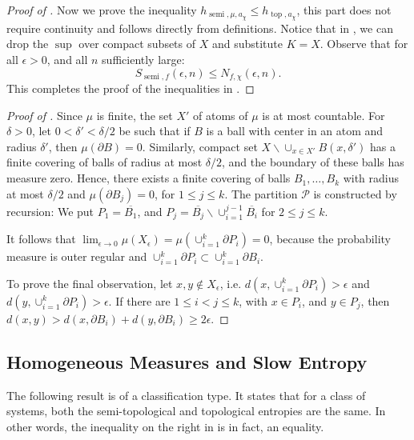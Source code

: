 \documentclass[oneside]{amsart}
\theoremstyle{plain}
\theoremstyle{definition}
\newcommand{\<}{\langle}
\renewcommand{\>}{\rangle}
\renewcommand{\P}{\mathcal{P}}
\newcommand{\e}{\epsilon}
\newcommand{\topo}{\operatorname{top}}
\renewcommand{\bar}{\overline}
\renewcommand{\|}{|\!|} %
\newcommand{\semitop}{\operatorname{semi}} %
\begin{document}
\begin{proof}[Proof of ]
     Now we prove the inequality $h_{\semitop,\mu,a_\chi} \le h_{\topo,a_\chi}$, this part does not require continuity and follows directly from definitions.  Notice that in , we can drop the $\sup$ over compact subsets of $X$ and substitute $K=X$. Observe that for all $\e>0$, and all $n$ sufficiently large:
     \begin{equation*}
         S_{\semitop,f}(\e,n) 
         \leq 
         N_{f,\chi}(\e,n).
     \end{equation*}
     This completes the proof of the inequalities in .
\end{proof}

\begin{proof}[Proof of ]
Since $\mu$ is finite, the set $X'$ of atoms of $\mu$ is at most countable. 
For $\delta>0$, let $0<\delta'< \delta/2$ be 
such that if $B$ is a ball with center in an atom and radius $\delta'$, then $\mu(\partial B) = 0$. Similarly,
compact set $X \backslash \cup_{x \in X'} B(x,\delta')$ has a finite covering of balls of radius at most 
$\delta/2$, and the boundary of these balls has measure zero. 
Hence, there exists a finite covering of balls $B_1, \dots, B_k$ with radius at most $\delta/2$ and 
$\mu(\partial B_j) = 0$, for $1 \le j \le k$. The partition $\P$ is constructed by recursion: We put 
$P_1 = \bar{B_1}$, and $P_j = \bar{B_j} \backslash \cup_{i=1}^{j-1}\bar{B_i}$ for $2 \leq j\leq k$.

It follows that $\lim_{\e \to 0}\mu(X_\e) =\mu(\cup_{i=1}^k \partial P_i) =0$, 
because the probability measure is outer regular and $\cup_{i=1}^k \partial P_i \subset \cup_{i=1}^k \partial B_i.$

To prove the final observation, let $x,y \not \in X_\e$, i.e. $d(x,\cup_{i=1}^k \partial P_i) >\e$ and
$d(y,\cup_{i=1}^k \partial P_i)>\e.$ If there are $1 \le i < j \le k$, with $x \in P_i$, and $y \in P_j$, 
then $d(x,y)> d (x, \partial B_i) + d(y,\partial B_i) \geq 2\e.$
\end{proof}

\subsection{Homogeneous Measures and Slow Entropy}

The following result is of a classification type. It states that for a class of systems, both the semi-topological and topological entropies are the same. In other words, the inequality on the right in  is in fact, an equality.
\end{document}
